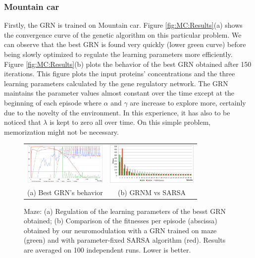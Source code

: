 \subsubsection{Mountain car}
Firstly, the GRN is trained on Mountain car. Figure \ref{fig:MC:Results}(a) shows the convergence curve of the genetic algorithm on this particular problem. We can observe that the best GRN is found very quickly (lower green curve) before being slowly optimized to regulate the learning parameters more efficiently. Figure \ref{fig:MC:Results}(b) plots the behavior of the best GRN obtained after 150 iterations. This figure plots the input proteins' concentrations and the three learning parameters calculated by the gene regulatory network. The GRN maintains the parameter values almost constant over the time except at the beginning of each episode where $\alpha$ and $\gamma$ are increase to explore more, certainly due to the novelty of the environment. In this experience, it has also to be noticed that $\lambda$ is kept to zero all over time. On this simple problem, memorization might not be necessary. 

\begin{figure}[b!]
\setlength{\tabcolsep}{0.5mm}
\begin{tabular}{cc}
\includegraphics[height=2cm]{MZ_GRNBehavior.pdf}&
\includegraphics[height=2cm]{MZ_GRNvsSARSA.pdf}\\
(a) Best GRN's behavior &
(b) GRNM vs SARSA
\end{tabular}
\caption{Maze: (a) Regulation of the learning parameters of the besst GRN obtained; (b) Comparison of the fitnesses per episode (abscissa) obtained by our neuromodulation with a GRN trained on maze (green) and with parameter-fixed SARSA algorithm (red). Results are averaged on 100 independent runs. Lower is better.}\label{fig:MZ:Results}
\end{figure}

